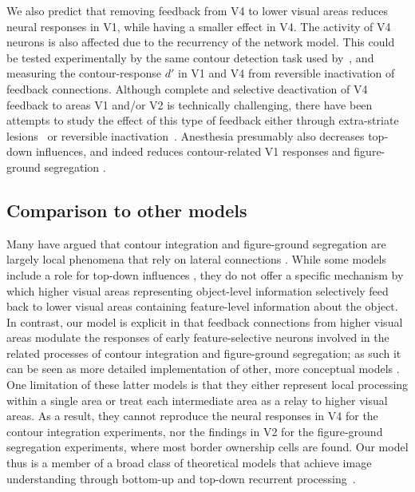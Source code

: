 We also predict that removing feedback from V4 to lower visual areas
reduces neural responses in V1, while having a smaller effect in V4.
The activity of V4 neurons is also affected due to the recurrency of
the network model. 
This could be tested experimentally by the same contour
detection task used by~\cite{Chen_etal14}, and measuring the
contour-response $d'$ in V1 and V4 from reversible inactivation of
feedback connections. Although complete and selective deactivation of
V4 feedback to areas V1 and/or V2 is technically challenging, there
have been attempts to study the effect of this type of feedback either
through extra-striate lesions~\citep{Super_Lamme07} or reversible
inactivation~\citep{Jansen_etal12}.  Anesthesia presumably also
decreases top-down influences, and indeed reduces contour-related V1
responses \citep{Li_etal08a} and figure-ground segregation
\citep{Lamme_etal98}.

\subsection{Comparison to other models}

Many have argued that contour integration and figure-ground
segregation are largely local phenomena that rely on lateral
connections \citep{Grossberg94, Grossberg97, Li98, Zhaoping05,
  Piech_etal13}.  While some models include a role for top-down
influences \citep{Li98,Piech_etal13}, they do not offer a specific
mechanism by which higher visual areas representing object-level
information selectively feed back to lower visual areas containing
feature-level information about the object.  In contrast, our model is
explicit in that feedback connections from higher visual areas
modulate the responses of early feature-selective neurons involved in
the related processes of contour integration and figure-ground
segregation; as such it can be seen as more detailed implementation of
other, more conceptual models \citep{Piech_etal13,Poort_etal12}. One
limitation of these latter models is that they either represent local
processing within a single area or treat each intermediate area as a
relay to higher visual areas. As a result, they cannot reproduce the
neural responses in V4 for the contour integration experiments, nor
the findings in V2 for the figure-ground segregation experiments,
where most border ownership cells are found. Our model thus is a
member of a broad class of theoretical models that achieve image
understanding through bottom-up and top-down recurrent
processing~\citep{Ullman84,Hochstein_Ahissar02,Roelfsema_06,Epshtein_etal08}.

